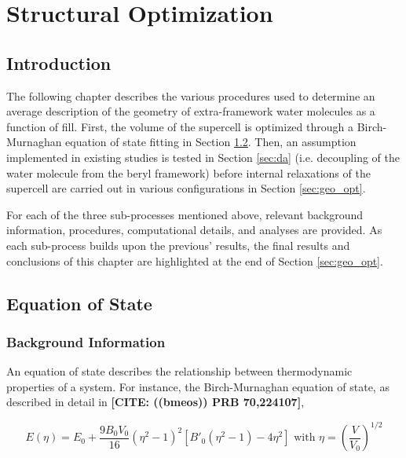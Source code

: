 \chapter{Structural Optimization}
\label{ch:struct_opt}

    \section{Introduction}
    
    The following chapter describes the various procedures used to determine an average description of the geometry of extra-framework water molecules as a function of fill. First, the volume of the supercell is optimized through a Birch-Murnaghan equation of state fitting in Section \ref{sec:eos}. Then, an assumption implemented in existing studies is tested in Section \ref{sec:da} (i.e. decoupling of the water molecule from the beryl framework) before internal relaxations of the supercell are carried out in various configurations in Section \ref{sec:geo_opt}.
    
    For each of the three sub-processes mentioned above, relevant background information, procedures, computational details, and analyses are provided. As each sub-process builds upon the previous' results, the final results and conclusions of this chapter are highlighted at the end of Section \ref{sec:geo_opt}.
    
    \section{Equation of State}
    \label{sec:eos}
        \subsection{Background Information}
        
            An equation of state describes the relationship between thermodynamic properties of a system. For instance, the Birch-Murnaghan equation of state, as described in detail in \textbf{[CITE: ((bmeos)) PRB 70,224107]},
            
            \begin{equation}
            \label{eq:bm_eos}
                E(\eta) = E_0 + \frac{9B_0V_0}{16}\left(\eta^2 -1\right)^2\left[ B'_0 \left(\eta^2-1\right) -4\eta^2\right] \text{ with } \eta = \left(\frac{V}{V_0}\right)^{1/2}
            \end{equation}
            
